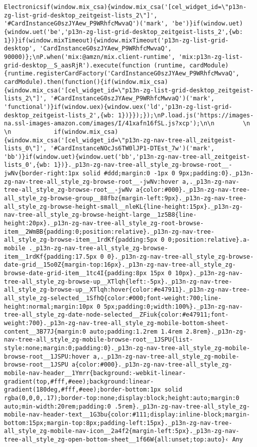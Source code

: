 \documentclass[
]{article}
\begin{document}
\begin{verbatim}
Electronicsif(window.mix_csa){window.mix_csa('[cel_widget_id=\"p13n-zg-list-grid-desktop_zeitgeist-lists_2\"]', '#CardInstanceG0szJYAew_P9WRhfcMwvaQ')('mark', 'be')}if(window.uet){window.uet('be','p13n-zg-list-grid-desktop_zeitgeist-lists_2',{wb: 1})}if(window.mixTimeout){window.mixTimeout('p13n-zg-list-grid-desktop', 'CardInstanceG0szJYAew_P9WRhfcMwvaQ', 90000)};\nP.when('mix:@amzn/mix.client-runtime', 'mix:p13n-zg-list-grid-desktop__S_aasRjR').execute(function (runtime, cardModule) {runtime.registerCardFactory('CardInstanceG0szJYAew_P9WRhfcMwvaQ', cardModule).then(function(){if(window.mix_csa){window.mix_csa('[cel_widget_id=\"p13n-zg-list-grid-desktop_zeitgeist-lists_2\"]', '#CardInstanceG0szJYAew_P9WRhfcMwvaQ')('mark', 'functional')}if(window.uex){window.uex('ld','p13n-zg-list-grid-desktop_zeitgeist-lists_2',{wb: 1})}});});\nP.load.js('https://images-na.ssl-images-amazon.com/images/I/41xafn16fSL.js?xcp');\n\n        \n        \n            if(window.mix_csa){window.mix_csa('[cel_widget_id=\"p13n-zg-nav-tree-all_zeitgeist-lists_0\"]', '#CardInstanceNOcJs6TW0lJP1-DTEst_7w')('mark', 'bb')}if(window.uet){window.uet('bb','p13n-zg-nav-tree-all_zeitgeist-lists_0',{wb: 1})}._p13n-zg-nav-tree-all_style_zg-browse-root__-jwNv{border-right:1px solid #ddd;margin:0 -1px 0 9px;padding:0}._p13n-zg-nav-tree-all_style_zg-browse-root__-jwNv:hover a,._p13n-zg-nav-tree-all_style_zg-browse-root__-jwNv a{color:#000}._p13n-zg-nav-tree-all_style_zg-browse-group__88fbz{margin-left:9px}._p13n-zg-nav-tree-all_style_zg-browse-height-small__nleKL{line-height:15px}._p13n-zg-nav-tree-all_style_zg-browse-height-large__1z5B8{line-height:20px}._p13n-zg-nav-tree-all_style_zg-root-browse-item__2WmBB{padding:0;position:relative}._p13n-zg-nav-tree-all_style_zg-browse-item__1rdKf{padding:5px 0 0;position:relative}.a-mobile ._p13n-zg-nav-tree-all_style_zg-browse-item__1rdKf{padding:17.5px 0 0}._p13n-zg-nav-tree-all_style_zg-browse-date-grid__15o0Z{margin-top:16px}._p13n-zg-nav-tree-all_style_zg-browse-date-grid-item__1tc4I{padding:8px 15px 0 10px}._p13n-zg-nav-tree-all_style_zg-browse-up__XTlqh{left:-5px}._p13n-zg-nav-tree-all_style_zg-browse-up__XTlqh:hover{color:#e47911}._p13n-zg-nav-tree-all_style_zg-selected__1SfhQ{color:#000;font-weight:700;line-height:normal;margin:10px 0 5px;padding:0;width:100%}._p13n-zg-nav-tree-all_style_zg-date-node-selected__ZFiuk{color:#e47911;font-weight:700}._p13n-zg-nav-tree-all_style_zg-mobile-bottom-sheet-content__3B77J{margin:0 auto;padding:1.2rem 1.4rem 2.8rem}._p13n-zg-nav-tree-all_style_zg-mobile-browse-root__1JSPU{list-style:none;margin:0;padding:0}._p13n-zg-nav-tree-all_style_zg-mobile-browse-root__1JSPU:hover a,._p13n-zg-nav-tree-all_style_zg-mobile-browse-root__1JSPU a{color:#000}._p13n-zg-nav-tree-all_style_zg-mobile-nav-header__1Ymrr{background:-webkit-linear-gradient(top,#fff,#eee);background:linear-gradient(180deg,#fff,#eee);border-bottom:1px solid rgba(0,0,0,.17);border-top:none;display:block;height:auto;margin:0 auto;min-width:20rem;padding:0 .5rem}._p13n-zg-nav-tree-all_style_zg-mobile-nav-header-text__1G3bu{color:#111;display:inline-block;margin-bottom:15px;margin-top:8px;padding-left:15px}._p13n-zg-nav-tree-all_style_zg-mobile-nav-icon__2a4f2{margin-left:5px}._p13n-zg-nav-tree-all_style_zg-open-bottom-sheet__1f66W{all:unset;top:auto}‹ Any 
\end{verbatim}
\end{document}
